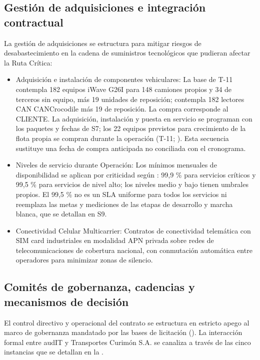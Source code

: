 \FloatBarrier
\subsection{Gestión de adquisiciones e integración contractual}\label{sec:6-gestion-adquisiciones}\label{sec:06-gestion-de-adquisiciones-e-integracion-contractual}

La gestión de adquisiciones se estructura para mitigar riesgos de desabastecimiento en la cadena de suministros tecnológicos que pudieran afectar la Ruta Crítica:

\begin{itemize}
\item Adquisición e instalación de componentes vehiculares: La base de T-11 contempla 182 equipos iWave G26I para 148 camiones propios y 34 de terceros sin equipo, más 19 unidades de reposición; contempla 182 lectores CAN CANCrocodile más 19 de reposición. La compra corresponde al CLIENTE. La adquisición, instalación y puesta en servicio se programan con los paquetes y fechas de S7; los 22 equipos previstos para crecimiento de la flota propia se compran durante la operación (T-11; ). Esta secuencia sustituye una fecha de compra anticipada no conciliada con el cronograma.
\item Niveles de servicio durante Operación: Los mínimos mensuales de disponibilidad se aplican por criticidad según : 99,9 \% para servicios críticos y 99,5 \% para servicios de nivel alto; los niveles medio y bajo tienen umbrales propios. El 99,5 \% no es un SLA uniforme para todos los servicios ni reemplaza las metas y mediciones de las etapas de desarrollo y marcha blanca, que se detallan en S9.
\item Conectividad Celular Multicarrier: Contratos de conectividad telemática con SIM card industriales en modalidad APN privada sobre redes de telecomunicaciones de cobertura nacional, con conmutación automática entre operadores para minimizar zonas de silencio.
\end{itemize}

\FloatBarrier
\subsection{Comités de gobernanza, cadencias y mecanismos de decisión}\label{sec:6-gestion-ceremonias}\label{sec:06-comites-de-gobernanza-cadencias-y-mecanismos-de-decision}

El control directivo y operacional del contrato se estructura en estricto apego al marco de gobernanza mandatado por las bases de licitación (). La interacción formal entre audIT y Transportes Curimón S.A. se canaliza a través de las cinco instancias que se detallan en la .

